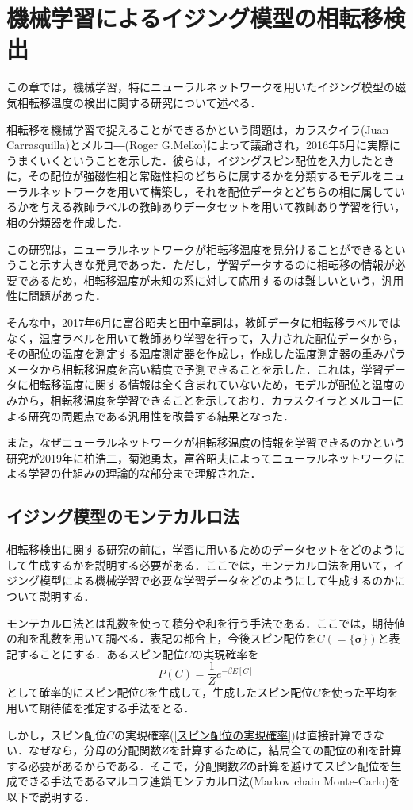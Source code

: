 \documentclass[a4paper,11pt]{jsreport}
\begin{document}
\chapter{機械学習によるイジング模型の相転移検出}
この章では，機械学習，特にニューラルネットワークを用いたイジング模型の磁気相転移温度の検出に関する研究について述べる．\par
相転移を機械学習で捉えることができるかという問題は，カラスクイラ(Juan Carrasquilla)とメルコ―(Roger G.Melko)によって議論され，2016年5月に実際にうまくいくということを示した．彼らは，イジングスピン配位を入力したときに，その配位が強磁性相と常磁性相のどちらに属するかを分類するモデルをニューラルネットワークを用いて構築し，それを配位データとどちらの相に属しているかを与える教師ラベルの教師ありデータセットを用いて教師あり学習を行い，相の分類器を作成した．\par
この研究は，ニューラルネットワークが相転移温度を見分けることができるということ示す大きな発見であった．ただし，学習データするのに相転移の情報が必要であるため，相転移温度が未知の系に対して応用するのは難しいという，汎用性に問題があった．\par
そんな中，2017年6月に富谷昭夫と田中章詞は，教師データに相転移ラベルではなく，温度ラベルを用いて教師あり学習を行って，入力された配位データから，その配位の温度を測定する温度測定器を作成し，作成した温度測定器の重みパラメータから相転移温度を高い精度で予測できることを示した．これは，学習データに相転移温度に関する情報は全く含まれていないため，モデルが配位と温度のみから，相転移温度を学習できることを示しており．カラスクイラとメルコーによる研究の問題点である汎用性を改善する結果となった．\par
また，なぜニューラルネットワークが相転移温度の情報を学習できるのかという研究が2019年に柏浩二，菊池勇太，富谷昭夫によってニューラルネットワークによる学習の仕組みの理論的な部分まで理解された．
\section{イジング模型のモンテカルロ法}
相転移検出に関する研究の前に，学習に用いるためのデータセットをどのようにして生成するかを説明する必要がある．ここでは，モンテカルロ法を用いて，イジング模型による機械学習で必要な学習データをどのようにして生成するのかについて説明する．\par
モンテカルロ法とは乱数を使って積分や和を行う手法である．ここでは，期待値の和を乱数を用いて調べる．表記の都合上，今後スピン配位を$C(=\{\bm{\sigma}\})$と表記することにする．あるスピン配位$C$の実現確率を
\begin{equation}
  \label{スピン配位の実現確率}
  P(C)=\frac{1}{Z}e^{-\beta E[C]}
\end{equation}
として確率的にスピン配位$C$を生成して，生成したスピン配位$C$を使った平均を用いて期待値を推定する手法をとる．\par
しかし，スピン配位$C$の実現確率(\ref{スピン配位の実現確率})は直接計算できない．なぜなら，分母の分配関数$Z$を計算するために，結局全ての配位の和を計算する必要があるからである．そこで，分配関数$Z$の計算を避けてスピン配位を生成できる手法であるマルコフ連鎖モンテカルロ法(Markov chain Monte-Carlo)を以下で説明する．
\end{document}
